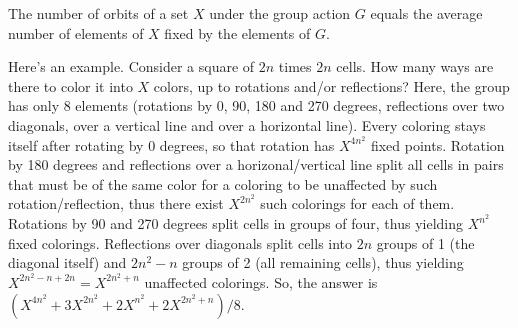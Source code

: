 The number of orbits of a set $X$ under the group action $G$ equals the average
number of elements of $X$ fixed by the elements of $G$.

Here's an example. Consider a square of $2n$ times $2n$ cells. How many ways
are there to color it into $X$ colors, up to rotations and/or reflections?
Here, the group has only 8 elements (rotations by 0, 90, 180 and 270 degrees,
reflections over two diagonals, over a vertical line and over a horizontal
line). Every coloring stays itself after rotating by 0 degrees, so that
rotation has $X^{4n^2}$ fixed points. Rotation by 180 degrees and reflections
over a horizonal/vertical line split all cells in pairs that must be of the
same color for a coloring to be unaffected by such rotation/reflection, thus
there exist $X^{2n^2}$ such colorings for each of them. Rotations by 90 and 270
degrees split cells in groups of four, thus yielding $X^{n^2}$ fixed colorings.
Reflections over diagonals split cells into $2n$ groups of 1 (the diagonal
itself) and $2n^2-n$ groups of 2 (all remaining cells), thus yielding
$X^{2n^2-n+2n}=X^{2n^2+n}$ unaffected colorings.  So, the answer is
$(X^{4n^2}+3X^{2n^2}+2X^{n^2}+2X^{2n^2+n})/8$.
